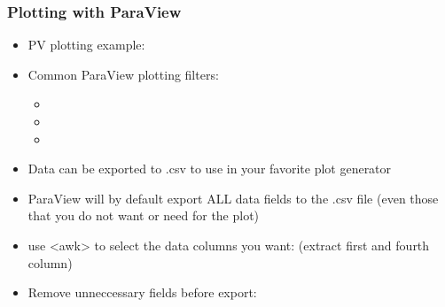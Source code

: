 \begin{frame}

  \frametitle{Plotting with ParaView}

  \begin{itemize}

      \item PV plotting example: 

      \item Common ParaView plotting filters:
      \begin{itemize}

        \item {} 

        \item {} 

        \item {} 

      \end{itemize}

    \item Data can be exported to .csv to use in your favorite plot generator 

    \item ParaView will by default export ALL data fields to the .csv file (even those that you do not want or need for the plot) 

    \item {} use <awk> to select the data columns you want:  (extract first and fourth column)

    \item {} Remove unneccessary fields before export: 

  \end{itemize}

\end{frame}


